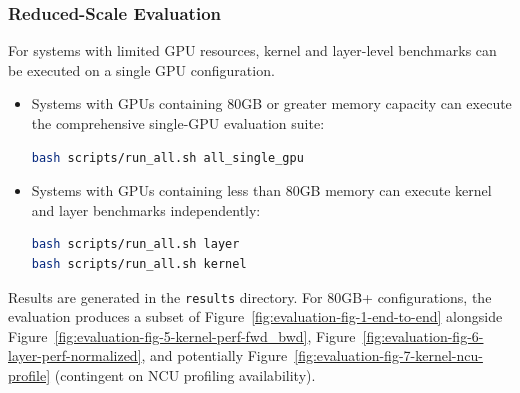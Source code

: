 \subsubsection{Reduced-Scale Evaluation}

For systems with limited GPU resources, kernel and layer-level benchmarks can be executed on a single GPU configuration.

\begin{itemize}
    \item Systems with GPUs containing 80GB or greater memory capacity can execute the comprehensive single-GPU evaluation suite:
    \vspace{3pt}
\begin{lstlisting}[language=bash]
bash scripts/run_all.sh all_single_gpu
\end{lstlisting}
    \item Systems with GPUs containing less than 80GB memory can execute kernel and layer benchmarks independently:
    \vspace{3pt}
\begin{lstlisting}[language=bash]
bash scripts/run_all.sh layer
bash scripts/run_all.sh kernel
\end{lstlisting}
\end{itemize}

Results are generated in the \texttt{results} directory. For 80GB+ configurations, the evaluation produces a subset of Figure~\ref{fig:evaluation-fig-1-end-to-end} alongside Figure~\ref{fig:evaluation-fig-5-kernel-perf-fwd_bwd}, Figure~\ref{fig:evaluation-fig-6-layer-perf-normalized}, and potentially Figure~\ref{fig:evaluation-fig-7-kernel-ncu-profile} (contingent on NCU profiling availability).



